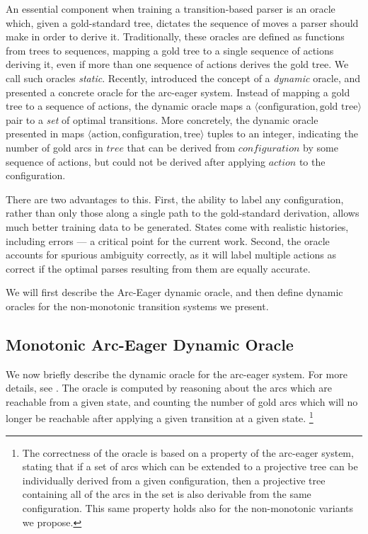 \documentclass[11pt,letterpaper]{article}
\newcommand{\tuple}[1]{$\langle#1\rangle$}
\newcommand{\note}[1]{\textcolor{red}{#1}}
\begin{document}
 An essential component when training a transition-based parser is an oracle
 which, given a gold-standard tree, dictates the sequence of moves a parser
 should make in order to derive it.  Traditionally, these oracles are defined
 as functions from trees to sequences, mapping a gold tree to a single sequence
 of actions deriving it, even if more than one sequence of actions derives the
 gold tree. We call such oracles \emph{static}.  Recently, 
 \citet{goldberg:12} introduced the concept of a \emph{dynamic} oracle, and
 presented a concrete oracle for the arc-eager system.  Instead of mapping a
 gold tree to a sequence of actions, the dynamic oracle maps a
 \tuple{\text{configuration}, \text{gold tree}} pair to a \emph{set} of optimal transitions.
 More concretely, the dynamic
    oracle presented in \cite{goldberg:12} maps
\tuple{\text{action},\text{configuration},\text{tree}}
    tuples to an integer, indicating the number of gold arcs in $tree$
that can be
    derived from $configuration$ by some sequence of actions, but
could not be derived
    after applying $action$ to the configuration.

There are two advantages to this. First, the ability to label any configuration,
rather than only those along a single path to the gold-standard derivation,
allows much better training data to be generated. States come with realistic
histories, including errors --- a critical point for the current work. Second,
the oracle accounts for spurious ambiguity correctly, as it will label multiple actions
as correct if the optimal parses resulting from them are equally accurate.

We will first describe the Arc-Eager dynamic oracle, and then define dynamic
oracles for the non-monotonic transition systems we present.

\subsection{Monotonic Arc-Eager Dynamic Oracle}

We now briefly describe the dynamic oracle for the arc-eager system. For more
details, see \citet{goldberg:12}. The oracle is computed by reasoning about the
arcs which are reachable from a given state, and counting the number of gold
arcs which will no longer be reachable after applying a given transition at a
given state.
\footnote{The correctness of
the oracle is based on a property of the arc-eager system, stating that if a
set of arcs which can be extended to a projective tree can be individually
derived from a given configuration, then a projective tree containing all of
the arcs in the set is also derivable from the same configuration. This same
property holds also for the non-monotonic variants we propose.}
\end{document}
